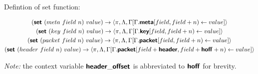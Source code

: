 Defintion of set function:
\begin{mdframed}
\begin{gather*}
  (\bm{\mathsf{{set}}} \ (meta \ field \ n) \ value)
  \rightarrow
  \langle \pi, \Lambda, \Gamma[\Gamma.\bm{\mathsf{{meta}}}[field, field + n) \leftarrow value] \rangle
  \\
  (\bm{\mathsf{{set}}} \ (key \ field \ n) \ value)
  \rightarrow
  \langle \pi, \Lambda, \Gamma[\Gamma.\bm{\mathsf{{key}}}[field, field + n) \leftarrow value] \rangle
  \\
  (\bm{\mathsf{{set}}} \ (packet \ field \ n) \ value)
  \rightarrow
  \langle \pi, \Lambda, \Gamma[\Gamma.\bm{\mathsf{{packet}}}[field, field + n) \leftarrow value] \rangle
  \\
  (\bm{\mathsf{{set}}} \ (header \ field \ n) \ value)
  \rightarrow
  \langle \pi, \Lambda, \Gamma[\Gamma.\bm{\mathsf{{packet}}}[field + \bm{\mathsf{{header}}},
      field + \bm{\mathsf{{hoff}}} + n) \leftarrow value] \rangle
  \\
\end{gather*}
\end{mdframed}
\textit{Note:} the context variable $\bm{\mathsf{{header\_offset}}}$ is abbreviated to $\bm{\mathsf{{hoff}}}$ for brevity.
